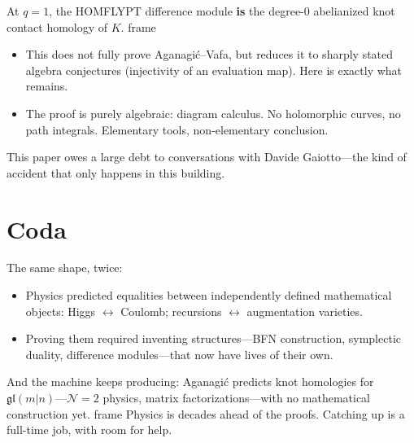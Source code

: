 \documentclass[presentation]{beamer}
\newenvironment{block}
\newenvironment{frame}
\theoremstyle{remark}
\begin{document}
\begin{frame}
  \begin{block}{Theorem (W.--Zaimi, 2026)}
    At $q=1$, the HOMFLYPT difference module {\bf is} the degree-0
    abelianized knot contact homology of $K$.
  \end{block}
  \begin{itemize}
  \item This does not fully prove Aganagi\'c--Vafa, but reduces it to
    sharply stated algebra conjectures (injectivity of an evaluation
    map).  Here is exactly what remains.
  \item The proof is purely algebraic: diagram calculus.  No
    holomorphic curves, no path integrals.  Elementary tools,
    non-elementary conclusion.
  \end{itemize}
  This paper owes a large debt to conversations with Davide
  Gaiotto---the kind of accident that only happens in this building.
\end{frame}

\section{Coda}
\begin{frame}
  The same shape, twice:
  \begin{itemize}
  \item Physics predicted equalities between independently defined
    mathematical objects: Higgs $\leftrightarrow$ Coulomb; recursions
    $\leftrightarrow$ augmentation varieties.
  \item Proving them required inventing structures---BFN construction,
    symplectic duality, difference modules---that now have lives of
    their own.
  \end{itemize}
  \begin{block}{}
    And the machine keeps producing: Aganagi\'c predicts knot
    homologies for $\mathfrak{gl}(m|n)$---$\mathcal{N}=2$ physics,
    matrix factorizations---with no mathematical construction yet.
  \end{block}
  Physics is decades ahead of the proofs.  Catching up is a full-time
  job, with room for help.
\end{frame}
\end{document}
